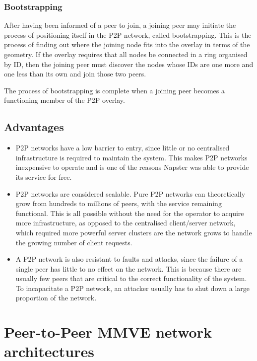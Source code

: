 \subsubsection{Bootstrapping}

After having been informed of a peer to join, a joining peer may initiate the process of positioning itself in the P2P network, called bootstrapping. This is the process of finding out where the joining node fits into the overlay in terms of the geometry. If the overlay requires that all nodes be connected in a ring organised by ID, then the joining peer must discover the nodes whose IDs are one more and one less than its own and join those two peers.

The process of bootstrapping is complete when a joining peer becomes a functioning member of the P2P overlay.


\subsection{Advantages}

\begin{itemize}
\item P2P networks have a low barrier to entry, since little or no centralised infrastructure is required to maintain the system. This makes P2P networks inexpensive to operate and is one of the reasons Napster was able to provide its service for free.

\item P2P networks are considered scalable. Pure P2P networks can theoretically grow from hundreds to millions of peers, with the service remaining functional. This is all possible without the need for the operator to acquire more infrastructure, as opposed to the centralised client/server network, which required more powerful server clusters are the network grows to handle the growing number of client requests.

\item A P2P network is also resistant to faults and attacks, since the failure of a single peer has little to no effect on the network. This is because there are usually few peers that are critical to the correct functionality of the system. To incapacitate a P2P network, an attacker usually has to shut down a large proportion of the network.
\end{itemize}


\section{Peer-to-Peer MMVE network architectures}
\label{p2p_network_architectures}

